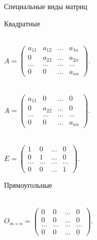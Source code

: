 \documentclass[unicode,11pt,notheorems]{beamer}
\begin{document}
\begin{frame}{Специальные виды матриц}
\begin{minipage}{0.45\textwidth}
{\centering \alert{Квадратные}\par}
	\\
		$A = \begin{pmatrix}
			a_{11} & a_{12} & \ldots & a_{1n} \\
			0 & a_{22} & \ldots & a_{2n} \\
			\ldots & \ldots & \ldots &\ldots \\
			0 & 0 & \ldots & a_{nn}
		\end{pmatrix}$.

	\medskip
	\\
		$A = \begin{pmatrix}
			a_{11} & 0 & \ldots & 0 \\
			0 & a_{22} & \ldots & 0 \\
			\ldots & \ldots & \ldots &\ldots \\
			0 & 0 & \ldots & a_{nn}
		\end{pmatrix}$.

	\medskip
	\\
		$E = \begin{pmatrix}
			1 & 0 & \ldots & 0 \\
			0 & 1 & \ldots & 0 \\
			\ldots & \ldots & \ldots &\ldots \\
			0 & 0 & \ldots & 1
		\end{pmatrix}$.

\vfill
\end{minipage}\hfill
\begin{minipage}{0.45\textwidth}
{\centering \alert{Прямоугольные}\par}
	\\
		$O_{m\times n} = \begin{pmatrix}
			0 & 0 & \ldots & 0 \\
			0 & 0 & \ldots & 0 \\
			\ldots & \ldots & \ldots &\ldots \\
			0 & 0 & \ldots & 0
		\end{pmatrix}$.		
	\vspace{5cm}
\end{minipage}
\end{frame}
\end{document}
